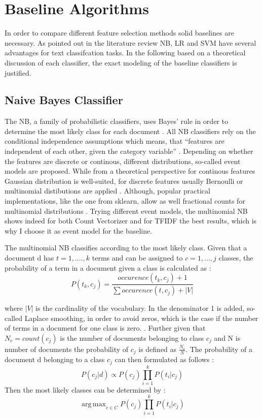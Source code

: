 \documentclass[12pt, a4paper, titlepage]{article}
\DeclareMathOperator*{\argmax}{arg\,max}
\begin{document}
\section{Baseline Algorithms}
In order to compare different feature selection methods solid baselines are necessary. As pointed out in the literature review \ac{NB}, \ac{LR} and \ac{SVM} have several advantages for text classifcation tasks. In the following based on a theoretical discussion of each classifier, the exact modeling of the baseline classifiers is justified. 

\subsection{Naive Bayes Classifier}
The \ac{NB}, a family of probabilistic classifiers, uses Bayes' rule in order to determine the most likely class for each document \citep{Schneider2005}. All \ac{NB} classifiers rely on the conditional independence assumptions which means, that ``features are independent of each other, given the category variable'' \citep[48]{Xu2018}. Depending on whether the features are discrete or continous, different distributions, so-called event models are proposed. While from a theoretical perspective for continous features Gaussian distribution is well-suited, for discrete features usually Bernoulli or multinomial distibutions are applied \citep{Xu2018}. Although, popular practical implementations, like the one from sklearn, allow as well fractional counts for multinomial distributions \citep{scikit-learn}. Trying different event models, the multinomial \ac{NB} shows indeed for both Count Vectorizer and for TFIDF the best results, which is why I choose it as event model for the baseline. 

The multinomial \ac{NB} classifies according to the most likely class. Given that a document d has $t = 1, ...., k$ terms and can be assigned to $c = 1,...,j$ classes, the probability of a term in a document given a class is calculated as \citep{Manning2008}:
\[ P(t_k, c_j) = \frac{occurence(t_k, c_j) + 1}{\sum occurence(t, c_j) + |V|} \]

where $|V|$ is the cardinality of the vocabulary. In the denominator 1 is added, so-called Laplace smoothing, in order to avoid zeros, which is the case if the number of terms in a document for one class is zero. \citep{Manning2008}. Further given that $N_c = count(c_j)$ is the number of documents belonging to class $c_j$ and N is number of documents the probability of $c_j$ is defined as $\frac{N_c}{N}$. The probability of a document d belonging to a class $c_j$ can then formulated as follows \citep[258]{Manning2008}:
\[ P(c_j|d) \propto P(c_j) \prod_{i = 1}^k P(t_i|c_j) \]
Then the most likely classes can be determined by \citep{Manning2008}: 
\[\argmax_{c \in C} P(c_j) \prod_{i = 1}^k P(t_i|c_j) \] 
\end{document}
